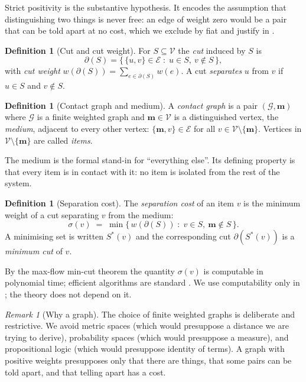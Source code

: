 \documentclass[11pt,twocolumn,a4paper]{article}
\theoremstyle{definition}
\newtheorem{definition}[theorem]{Definition}
\theoremstyle{remark}
\newtheorem{remark}[theorem]{Remark}
\newcommand{\Gph}{\mathcal{G}}
\newcommand{\V}{\mathcal{V}}
\newcommand{\E}{\mathcal{E}}
\newcommand{\med}{\mathbf{m}}
\newcommand{\wt}{w}
\newcommand{\cut}{\partial}
\newcommand{\sep}{\sigma}
\begin{document}
Strict positivity is the substantive hypothesis. It encodes the assumption
that distinguishing two things is never free: an edge of weight zero would
be a pair that can be told apart at no cost, which we exclude by fiat and
justify in .

\begin{definition}[Cut and cut weight]
\label{def:cut}
For $S\subseteq\V$ the \emph{cut} induced by $S$ is
\[
  \cut(S)=\bigl\{\,\{u,v\}\in\E \;:\; u\in S,\ v\notin S \,\bigr\},
\]
with \emph{cut weight} $\wt(\cut(S))=\sum_{e\in\cut(S)}\wt(e)$. A cut
\emph{separates} $u$ from $v$ if $u\in S$ and $v\notin S$.
\end{definition}

\begin{definition}[Contact graph and medium]
\label{def:contact}
A \emph{contact graph} is a pair $(\Gph,\med)$ where $\Gph$ is a finite
weighted graph and $\med\in\V$ is a distinguished vertex, the
\emph{medium}, adjacent to every other vertex:
$\{\med,v\}\in\E$ for all $v\in\V\setminus\{\med\}$. Vertices in
$\V\setminus\{\med\}$ are called \emph{items}.
\end{definition}

The medium is the formal stand-in for ``everything else''. Its defining
property is that every item is in contact with it: no item is isolated
from the rest of the system.

\begin{definition}[Separation cost]
\label{def:sepcost}
The \emph{separation cost} of an item $v$ is the minimum weight of a cut
separating $v$ from the medium:
\[
  \sep(v) \;=\; \min\bigl\{\, \wt(\cut(S)) \;:\; v\in S,\ \med\notin S \,\bigr\}.
\]
A minimising set is written $S^{*}(v)$ and the corresponding cut
$\cut(S^{*}(v))$ is a \emph{minimum cut} of $v$.
\end{definition}

By the max-flow min-cut theorem \citep{fordfulkerson1956} the quantity
$\sep(v)$ is computable in polynomial time; efficient algorithms are
standard \citep{stoer1997,gomory1961}. We use computability only in
; the theory does not depend on it.

\begin{remark}[Why a graph]
\label{rem:whygraph}
The choice of finite weighted graphs is deliberate and restrictive. We
avoid metric spaces (which would presuppose a distance we are trying to
derive), probability spaces (which would presuppose a measure), and
propositional logic (which would presuppose identity of terms). A graph
with positive weights presupposes only that there are things, that some
pairs can be told apart, and that telling apart has a cost.
\end{remark}
\end{document}

